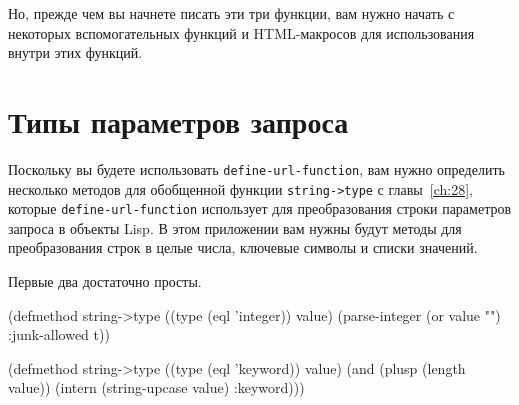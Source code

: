 Но, прежде чем вы начнете писать эти три функции, вам нужно начать с некоторых
вспомогательных функций и HTML-макросов для использования внутри этих функций.

\section{Типы параметров запроса}

Поскольку вы будете использовать \lstinline{define-url-function}, вам нужно определить
несколько методов для обобщенной функции \lstinline{string->type} с главы~\ref{ch:28},
которые \lstinline{define-url-function} использует для преобразования строки параметров
запроса в объекты Lisp. В этом приложении вам нужны будут методы для преобразования строк
в целые числа, ключевые символы и списки значений.

Первые два достаточно просты.

\begin{myverb}
(defmethod string->type ((type (eql 'integer)) value)
  (parse-integer (or value "") :junk-allowed t))

(defmethod string->type ((type (eql 'keyword)) value)
  (and (plusp (length value)) (intern (string-upcase value) :keyword)))
\end{myverb}

